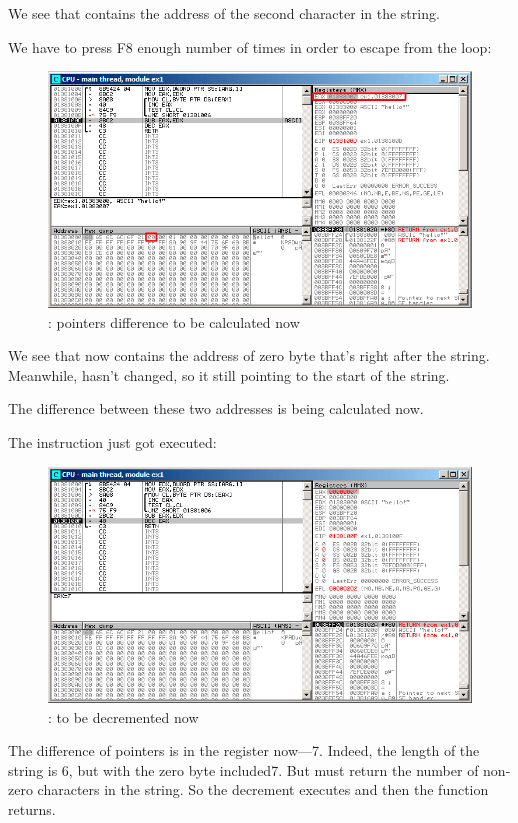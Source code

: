 We see that \EAX contains the address of the second character in the string.

\clearpage

We have to press F8 enough number of times in order to escape from the loop:

\begin{figure}[H]
\centering
\includegraphics[scale=\FigScale]{patterns/10_strings/1_strlen/olly3.png}
\caption{\olly: pointers difference to be calculated now}
\label{fig:strlen_olly_3}
\end{figure}

We see that \EAX now contains the address of zero byte that's right after the string.
Meanwhile, \EDX hasn't changed,
so it still pointing to the start of the string.

The difference between these two addresses is being calculated now.

\clearpage
The \SUB instruction just got executed:

\begin{figure}[H]
\centering
\includegraphics[scale=\FigScale]{patterns/10_strings/1_strlen/olly4.png}
\caption{\olly: \EAX to be decremented now}
\label{fig:strlen_olly_4}
\end{figure}

The difference of pointers is in the \EAX register now---7.
Indeed, the length of the  string is 6, 
but with the zero byte included\EMDASH{}7.
But  must return the number of non-zero characters in the string.
So the decrement executes and then the function returns.
